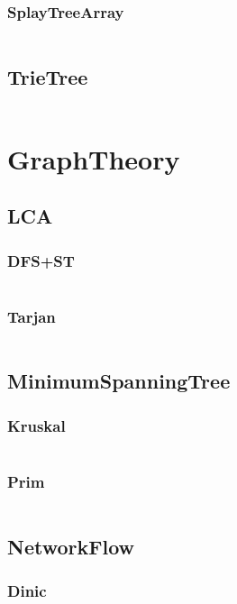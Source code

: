 \documentclass[a4paper,11pt]{article}
\begin{document}
\subsubsection{SplayTreeArray}
\inputminted[breaklines]{c++}{Template/03++DataStructure/+Splay/+SplayTreeArray.cpp}

\subsection{TrieTree}
\inputminted[breaklines]{c++}{Template/03++DataStructure/+TrieTree.cpp}

\newpage
\section{GraphTheory}
\subsection{LCA}
\subsubsection{DFS+ST}
\inputminted[breaklines]{c++}{Template/04++GraphTheory/+LCA/+DFS+ST.cpp}
\subsubsection{Tarjan}
\inputminted[breaklines]{c++}{Template/04++GraphTheory/+LCA/+Tarjan.cpp}

\subsection{MinimumSpanningTree}
\subsubsection{Kruskal}
\inputminted[breaklines]{c++}{Template/04++GraphTheory/+MinimumSpanningTree/+Kruskal.cpp}
\subsubsection{Prim}
\inputminted[breaklines]{c++}{Template/04++GraphTheory/+MinimumSpanningTree/+Prim.cpp}

\subsection{NetworkFlow}
\subsubsection{Dinic}
\inputminted[breaklines]{c++}{Template/04++GraphTheory/+NetworkFlow/+Dinic.cpp}
\end{document}
